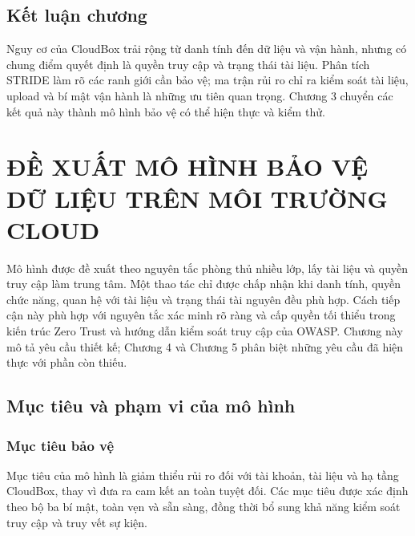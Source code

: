 \section{Kết luận chương}
Nguy cơ của CloudBox trải rộng từ danh tính đến dữ liệu và vận hành, nhưng có chung điểm quyết định là quyền truy cập và trạng thái tài liệu. Phân tích STRIDE làm rõ các ranh giới cần bảo vệ; ma trận rủi ro chỉ ra kiểm soát tài liệu, upload và bí mật vận hành là những ưu tiên quan trọng. Chương 3 chuyển các kết quả này thành mô hình bảo vệ có thể hiện thực và kiểm thử.
\chapter{ĐỀ XUẤT MÔ HÌNH BẢO VỆ DỮ LIỆU TRÊN MÔI TRƯỜNG CLOUD}
\label{chap:mohinh}
Mô hình được đề xuất theo nguyên tắc phòng thủ nhiều lớp, lấy tài liệu và quyền truy cập làm trung tâm. Một thao tác chỉ được chấp nhận khi danh tính, quyền chức năng, quan hệ với tài liệu và trạng thái tài nguyên đều phù hợp. Cách tiếp cận này phù hợp với nguyên tắc xác minh rõ ràng và cấp quyền tối thiểu trong kiến trúc Zero Trust và hướng dẫn kiểm soát truy cập của OWASP.\cite{zerotrust,authorization} Chương này mô tả yêu cầu thiết kế; Chương 4 và Chương 5 phân biệt những yêu cầu đã hiện thực với phần còn thiếu.

\section{Mục tiêu và phạm vi của mô hình}

\subsection{Mục tiêu bảo vệ}

Mục tiêu của mô hình là giảm thiểu rủi ro đối với tài khoản,
tài liệu và hạ tầng CloudBox, thay vì đưa ra cam kết an toàn
tuyệt đối. Các mục tiêu được xác định theo bộ ba bí mật,
toàn vẹn và sẵn sàng, đồng thời bổ sung khả năng kiểm soát
truy cập và truy vết sự kiện.

